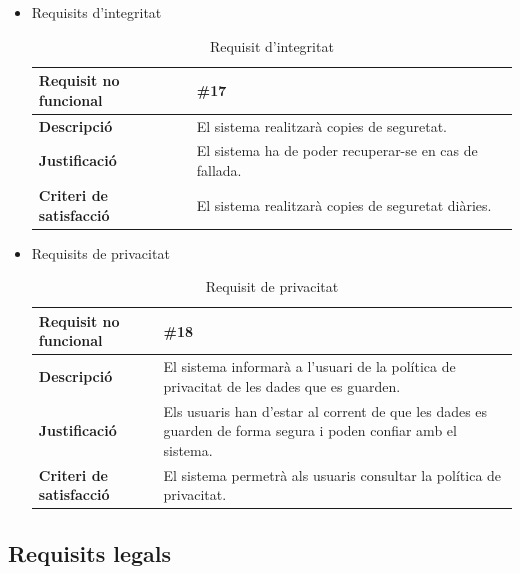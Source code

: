 \begin{itemize}
\item{Requisits d'integritat}
\begin{table}[!h]
\begin{tabular}{|l|M|}
\hline
\textbf{Requisit no funcional }& \#17  \\ \hline
\textbf{Descripció} &  El sistema realitzarà copies de seguretat.\\ \hline
\textbf{Justificació} &  El sistema ha de poder recuperar-se en cas de fallada. \\ \hline
\textbf{Criteri de satisfacció} &  El sistema realitzarà copies de seguretat diàries.\\ \hline
\end{tabular}
\label{}
\caption{Requisit d'integritat}
\end{table}


\item{Requisits de privacitat}
\begin{table}[!h]
\begin{tabular}{|l|M|}
\hline
\textbf{Requisit no funcional }& \#18  \\ \hline
\textbf{Descripció} & El sistema informarà a l’usuari de la política de privacitat de les dades que es guarden.\\ \hline
\textbf{Justificació} & Els usuaris han d’estar al corrent de que les dades es
guarden de forma segura i poden confiar amb el sistema. \\ \hline
\textbf{Criteri de satisfacció} & El sistema permetrà als usuaris consultar la política de privacitat.\\ \hline
\end{tabular}
\label{}
\caption{Requisit de privacitat}
\end{table}

\end{itemize}


\clearpage
\subsection{Requisits legals}

